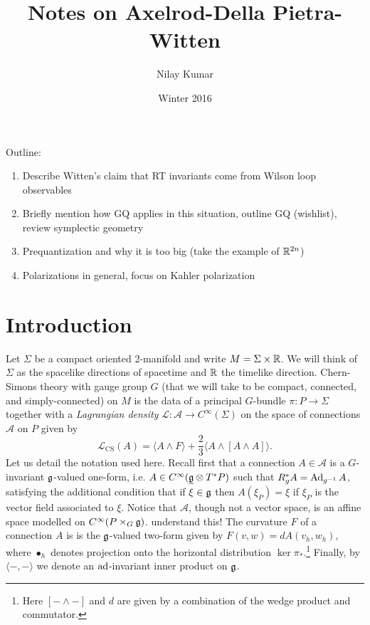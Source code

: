\documentclass{amsart}
\title{Notes on Axelrod-Della Pietra-Witten}
\author{Nilay Kumar}
\date{Winter 2016}
\begin{document}
\maketitle
\tableofcontents

Outline:
\begin{enumerate}
    \item Describe Witten's claim that RT invariants come from Wilson loop observables
    \item Briefly mention how GQ applies in this situation, outline GQ (wishlist), review symplectic geometry
    \item Prequantization and why it is too big (take the example of $\mathbb{R}^{2n}$)
    \item Polarizations in general, focus on Kahler polarization
\end{enumerate}

\section{Introduction}
Let $\Sigma$ be a compact oriented 2-manifold and write $M=\Sigma\times\mathbb{R}$. We will think of $\Sigma$ as the
spacelike directions of spacetime and $\mathbb{R}$ the timelike direction. Chern-Simons theory with gauge
group $G$ (that we will take to be compact, connected, and simply-connected) on $M$ is the data of a principal
$G$-bundle $\pi:P\to\Sigma$ together with a
\textit{Lagrangian density} $\mathscr{L}:\mathscr{A}\to C^\infty(\Sigma)$ on the space of connections $\mathscr{A}$ on $P$
given by
\begin{equation*}
    \mathscr{L}_\text{CS}(A) = \langle A\wedge F\rangle + \frac{2}{3}\langle A\wedge [A\wedge A]\rangle.
\end{equation*}
Let us detail the notation used here. Recall first that a connection $A\in\mathscr{A}$ is
a $G$-invariant $\mathfrak g$-valued one-form, i.e. $A\in C^\infty(\underline{\mathfrak g}\otimes T^*P)$ such that
$R_g^*A = \operatorname{Ad}_{g^{-1}}A$, satisfying the additional condition that if $\xi\in\mathfrak g$ then
$A(\xi_P)=\xi$ if $\xi_P$ is the vector field associated to $\xi$. Notice that $\mathscr{A}$,
though not a vector space, is an affine space modelled on $C^\infty(P\times_G\mathfrak g)$. {\color{red}understand this!}
The curvature $F$ of a connection $A$ is is the $\mathfrak g$-valued two-form given by $F(v,w) = dA(v_h,w_h)$,
where $\bullet_h$ denotes projection onto the horizontal distribution $\ker\pi_*$.\footnote{Here
$[-\wedge-]$ and $d$ are given by a combination of the wedge product and commutator.}
Finally, by $\langle-,-\rangle$ we denote an $\operatorname{ad}$-invariant inner product on $\mathfrak g$.
\end{document}
